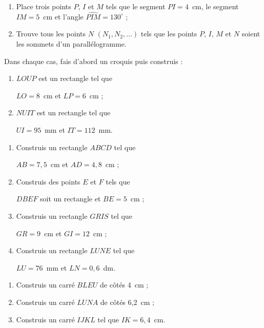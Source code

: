 \begin{exercice}
\begin{enumerate}
 \item Place trois points $P$, $I$ et $M$ tels que le segment $PI = 4$ cm, le segment $IM = 5$ cm et l'angle $\widehat{PIM} = 130^\circ$ ;
 \item Trouve tous les points $N$ $(N_1, N_2, \ldots)$ tels que les points $P$, $I$, $M$ et $N$ soient les sommets d'un parallélogramme.
 \end{enumerate}
\end{exercice}



\begin{exercice}
Dans chaque cas, fais d’abord un croquis puis construis :
\begin{enumerate}
 \item $LOUP$ est un rectangle tel que 
 
 $LO = 8$ cm et $LP = 6$ cm ;
 \item $NUIT$ est un rectangle tel que 
 
 $UI = 95$ mm et $IT = 112$ mm.
 \end{enumerate}
\end{exercice}
 
 
\begin{exercice}
\begin{enumerate}
 \item Construis un rectangle $ABCD$ tel que 
 
 $AB = 7,5$ cm et $AD = 4,8$ cm ;
 \item Construis des points $E$ et $F$ tels que 
 
 $DBEF$ soit un rectangle et $BE = 5$ cm ;
 \item Construis un rectangle $GRIS$ tel que 
 
 $GR = 9$ cm et $GI = 12$ cm ;
 \item Construis un rectangle $LUNE$ tel que 
 
 $LU = 76$ mm et $LN = 0,6$ dm.
 \end{enumerate} 
\end{exercice}


\begin{exercice}
\begin{enumerate}
 \item Construis un carré $BLEU$ de côtés 4 cm ;
 \item Construis un carré $LUNA$ de côtés 6,2 cm ;
 \item Construis un carré $IJKL$ tel que $IK = 6,4$ cm.
 \end{enumerate} 
\end{exercice}


